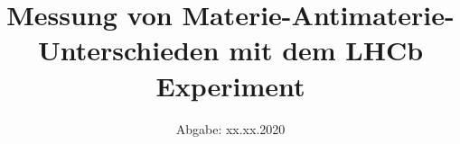 

\subject{Praktikumsversuch im SS2020}
\title{Messung von Materie-Antimaterie-Unterschieden mit dem LHCb Experiment}
\date{%
  Abgabe: xx.xx.2020
}



\maketitle
\thispagestyle{empty}
\tableofcontents
\newpage








%



